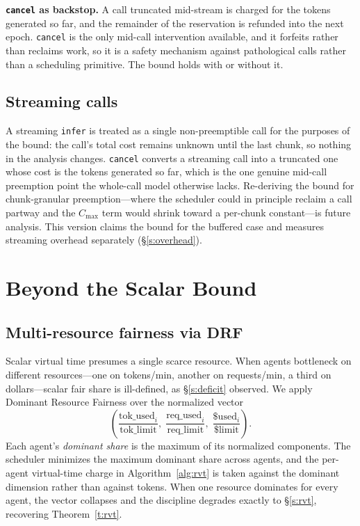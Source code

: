 \documentclass[letterpaper,11pt,leqno]{article}
\begin{document}
\textbf{\texttt{cancel} as backstop.} A call truncated mid-stream is charged for the tokens generated so far, and the remainder of the reservation is refunded into the next epoch. \texttt{cancel} is the only mid-call intervention available, and it forfeits rather than reclaims work, so it is a safety mechanism against pathological calls rather than a scheduling primitive. The bound holds with or without it.

\subsection{Streaming calls}\label{s:streaming}

A streaming \texttt{infer} is treated as a single non-preemptible call for the purposes of the bound: the call's total cost remains unknown until the last chunk, so nothing in the analysis changes. \texttt{cancel} converts a streaming call into a truncated one whose cost is the tokens generated so far, which is the one genuine mid-call preemption point the whole-call model otherwise lacks. Re-deriving the bound for chunk-granular preemption---where the scheduler could in principle reclaim a call partway and the $C_{\max}$ term would shrink toward a per-chunk constant---is future analysis. This version claims the bound for the buffered case and measures streaming overhead separately (\S\ref{s:overhead}).

\section{Beyond the Scalar Bound}\label{s:beyond}

\subsection{Multi-resource fairness via DRF}\label{s:drf}

Scalar virtual time presumes a single scarce resource. When agents bottleneck on different resources---one on tokens/min, another on requests/min, a third on dollars---scalar fair share is ill-defined, as \S\ref{s:deficit} observed. We apply Dominant Resource Fairness \citep{Ghodsi11} over the normalized vector
\[
  \left(\frac{\mathrm{tok\_used}_i}{\mathrm{tok\_limit}}, \; \frac{\mathrm{req\_used}_i}{\mathrm{req\_limit}}, \; \frac{\$\mathrm{used}_i}{\$\mathrm{limit}}\right).
\]
Each agent's \emph{dominant share} is the maximum of its normalized components. The scheduler minimizes the maximum dominant share across agents, and the per-agent virtual-time charge in Algorithm~\ref{alg:rvt} is taken against the dominant dimension rather than against tokens. When one resource dominates for every agent, the vector collapses and the discipline degrades exactly to \S\ref{s:rvt}, recovering Theorem~\ref{t:rvt}.
\end{document}
